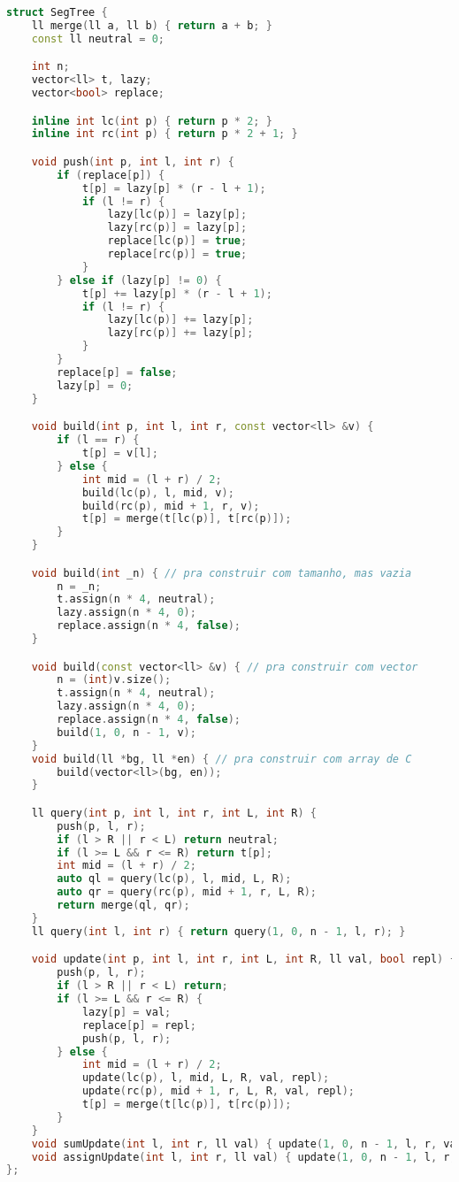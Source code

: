\documentclass[10pt, a4paper, oneside]{book}
\begin{document}
\begin{lstlisting}[language=C++]
struct SegTree {
    ll merge(ll a, ll b) { return a + b; }
    const ll neutral = 0;

    int n;
    vector<ll> t, lazy;
    vector<bool> replace;

    inline int lc(int p) { return p * 2; }
    inline int rc(int p) { return p * 2 + 1; }

    void push(int p, int l, int r) {
        if (replace[p]) {
            t[p] = lazy[p] * (r - l + 1);
            if (l != r) {
                lazy[lc(p)] = lazy[p];
                lazy[rc(p)] = lazy[p];
                replace[lc(p)] = true;
                replace[rc(p)] = true;
            }
        } else if (lazy[p] != 0) {
            t[p] += lazy[p] * (r - l + 1);
            if (l != r) {
                lazy[lc(p)] += lazy[p];
                lazy[rc(p)] += lazy[p];
            }
        }
        replace[p] = false;
        lazy[p] = 0;
    }

    void build(int p, int l, int r, const vector<ll> &v) {
        if (l == r) {
            t[p] = v[l];
        } else {
            int mid = (l + r) / 2;
            build(lc(p), l, mid, v);
            build(rc(p), mid + 1, r, v);
            t[p] = merge(t[lc(p)], t[rc(p)]);
        }
    }

    void build(int _n) { // pra construir com tamanho, mas vazia
        n = _n;
        t.assign(n * 4, neutral);
        lazy.assign(n * 4, 0);
        replace.assign(n * 4, false);
    }

    void build(const vector<ll> &v) { // pra construir com vector
        n = (int)v.size();
        t.assign(n * 4, neutral);
        lazy.assign(n * 4, 0);
        replace.assign(n * 4, false);
        build(1, 0, n - 1, v);
    }
    void build(ll *bg, ll *en) { // pra construir com array de C
        build(vector<ll>(bg, en));
    }

    ll query(int p, int l, int r, int L, int R) {
        push(p, l, r);
        if (l > R || r < L) return neutral;
        if (l >= L && r <= R) return t[p];
        int mid = (l + r) / 2;
        auto ql = query(lc(p), l, mid, L, R);
        auto qr = query(rc(p), mid + 1, r, L, R);
        return merge(ql, qr);
    }
    ll query(int l, int r) { return query(1, 0, n - 1, l, r); }

    void update(int p, int l, int r, int L, int R, ll val, bool repl) {
        push(p, l, r);
        if (l > R || r < L) return;
        if (l >= L && r <= R) {
            lazy[p] = val;
            replace[p] = repl;
            push(p, l, r);
        } else {
            int mid = (l + r) / 2;
            update(lc(p), l, mid, L, R, val, repl);
            update(rc(p), mid + 1, r, L, R, val, repl);
            t[p] = merge(t[lc(p)], t[rc(p)]);
        }
    }
    void sumUpdate(int l, int r, ll val) { update(1, 0, n - 1, l, r, val, 0); }
    void assignUpdate(int l, int r, ll val) { update(1, 0, n - 1, l, r, val, 1); }
};
\end{lstlisting}
\hfill
\end{document}
